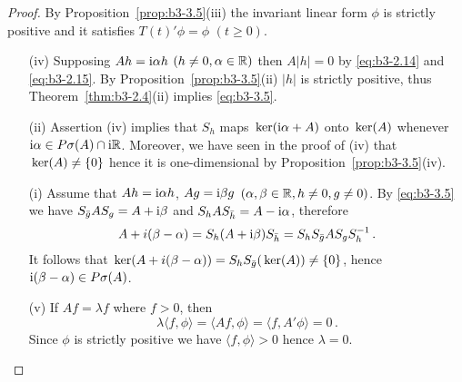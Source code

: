 \begin{proof}
	By Proposition~\ref{prop:b3-3.5}(iii) the invariant linear form $\phi$ is strictly positive and it satisfies $T(t)'\phi = \phi$ $(t \geq 0)$.
	\begin{enumerate}[wide, labelindent=.5em]
	\item[(iv)] 
	Supposing $Ah = \mathrm{i}\alpha h$ $(h \neq 0, \alpha \in \mathbb{R})$ then $A|h| = 0$ by \eqref{eq:b3-2.14} and \eqref{eq:b3-2.15}.
	By Proposition~\ref{prop:b3-3.5}(ii) $|h|$ is strictly positive, thus Theorem~\ref{thm:b3-2.4}(ii) implies \eqref{eq:b3-3.5}.
	
	\item[(ii)] 
	Assertion (iv) implies that $S_{h}$ maps $\mathop{}\mathrm{ker}(\mathrm{i}\alpha + A)$ onto $\mathop{}\mathrm{ker}(A)$ whenever $\mathrm{i} \alpha \in P\sigma(A)\cap \mathrm{i}\mathbb{R}$.
	Moreover, we have seen in the proof of (iv) that $\mathop{}\mathrm{ker}(A) \neq \{0\}$ hence it is one-dimensional by Proposition~\ref{prop:b3-3.5}(iv).
	
	\item[(i)] 
	Assume that $Ah = \mathrm{i}\alpha h$, $Ag = \mathrm{i}\beta g$ $(\alpha,\beta \in \mathbb{R}, h \neq 0, g \neq 0)$.
	By \eqref{eq:b3-3.5} we have $S_{\bar{g}}A S_{g} = A + \mathrm{i}\beta$ and $S_{h}A S_{\bar{h}} = A - \mathrm{i}\alpha$, therefore
	\begin{equation}\label{eq:b3-3.6}
	A + i(\beta - \alpha) = S_{h}(A + \mathrm{i}\beta)S_{\bar{h}} = S_{h}S_{\bar{g}}A S_{g}S_{h}^{-1}\,.
	\end{equation}
	It follows that $\mathop{}\mathrm{ker}(A + i(\beta - \alpha)) = S_{h}S_{\bar{g}}(\mathop{}\mathrm{ker}(A)) \neq \{0\}$, hence $\mathrm{i} (\beta - \alpha) \in P\sigma(A)$.
	
	\item[(v)] 
	If $Af = \lambda f$ where $f > 0$, then
	\begin{equation}\label{eq:b3-3.7}
	\lambda\langle f,\phi\rangle = \langle Af,\phi\rangle = \langle f,A'\phi\rangle = 0\,.
	\end{equation}
	Since $\phi$ is strictly positive we have $\langle f,\phi\rangle > 0$ hence $\lambda = 0$.
	

\end{enumerate}
\end{proof}
